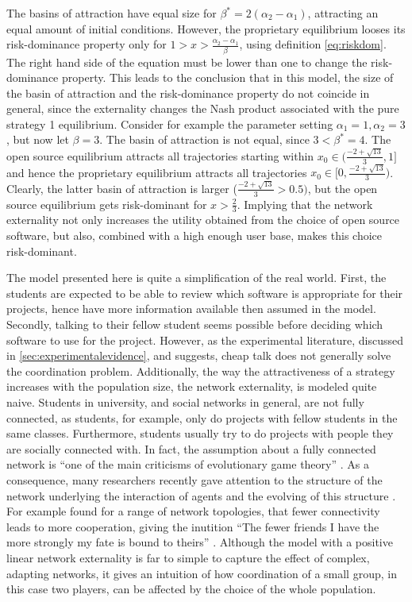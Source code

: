 \documentclass[11pt]{article}
\begin{document}
The basins of attraction have equal size for $\beta^* = 2 (\alpha_2 -\alpha_1)$,
attracting an equal amount of initial conditions. However,
the proprietary equilibrium looses its risk-dominance property 
only for $1 > x > \frac{\alpha_2-\alpha_1}{\beta}  $, using definition 
\ref{eq:riskdom}. The right hand side of the equation must be lower than one 
to change the risk-dominance property. This leads to the conclusion 
that in this model, the size of the basin of attraction and the risk-dominance
property do not coincide in general, since the externality changes the Nash 
product associated with the pure strategy 1 equilibrium. Consider for example 
the parameter setting $\alpha_1 =1, \alpha_2=3$, but now let $\beta=3$. 
The basin of attraction is not equal, since $3<\beta^*= 4$. 
The open source equilibrium attracts all trajectories starting within 
$x_0 \in (\frac{-2+\sqrt{13}}{3},1]$ and hence the proprietary equilibrium attracts
all trajectories $x_0 \in [0,\frac{-2+\sqrt{13}}{3})$. Clearly, the latter basin of 
attraction is larger ($\frac{-2+\sqrt{13}}{3}>0.5)$, 
but the open source equilibrium gets risk-dominant for
$x>\frac 23$. Implying that the network externality not only increases the
utility obtained from the choice of open source software, but also,
combined with a high enough user base, makes this choice risk-dominant. 

The model presented here is quite a simplification of the real world. 
First, the students are expected to be able to review which software is 
appropriate for their projects, hence have more information available then 
assumed in the model. Secondly, talking to their fellow student seems
possible before deciding which software to use for the project. 
However, as the experimental literature, discussed in 
\ref{sec:experimentalevidence}, and \textcite{aumann_nash_1990} suggests, 
cheap talk does not generally solve the coordination problem. 
Additionally, the way the attractiveness of a strategy increases with
the population size, the network externality, is modeled quite naive.
Students in university, and social networks in general, are not fully
connected, as students, for example, only do projects with fellow students
in the same classes. Furthermore, students usually try to do projects
with people they are socially connected with. In fact, the assumption about
a fully connected network is ``one of the main criticisms of evolutionary game
theory'' \parencite{hanauske_evolutionare_2011}. 
As a consequence, many researchers recently gave attention to the 
structure of the network underlying the interaction of agents and the 
evolving of this structure \parencite[46]{szabo_evolutionary_2007}.
For example \textcite{ohtsuki_simple_2006} found for a range of 
network topologies, that fewer connectivity 
leads to more cooperation, giving the inutition 
``The fewer friends I have the more strongly my fate is bound to theirs'' 
\parencite[1]{ohtsuki_simple_2006}.
Although the model with a positive linear network externality is far to 
simple to capture the effect of complex, adapting networks, it gives an 
intuition of how coordination of a small group, in this case two players, 
can be affected by the choice of the whole population.
\end{document}
